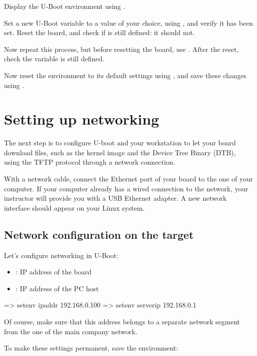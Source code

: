 Display the U-Boot environment using .

Set a new U-Boot variable  to a value of your choice, using
, and verify it has been set. Reset the board, and check
if  is still defined: it should not.

Now repeat this process, but before resetting the board, use
. After the reset, check the  variable is
still defined.

Now reset the environment to its default settings using , and save these changes using .

\section{Setting up networking}

The next step is to configure U-boot and your workstation to let your
board download files, such as the kernel image and the Device Tree Binary
(DTB), using the TFTP protocol through a network connection.

With a network cable, connect the  Ethernet port of your
board to the one of your computer. If your computer already has a
wired connection to the network, your instructor will provide you with
a USB Ethernet adapter. A new network interface should appear on your
Linux system.

\subsection{Network configuration on the target}

Let's configure networking in U-Boot:

\begin{itemize}
  \item {}: IP address of the board
  \item {}: IP address of the PC host
\end{itemize}

\begin{ubootinput}
=> setenv ipaddr 192.168.0.100
=> setenv serverip 192.168.0.1
\end{ubootinput}

Of course, make sure that this address belongs to a separate network
segment from the one of the main company network.

To make these settings permanent, save the environment:

